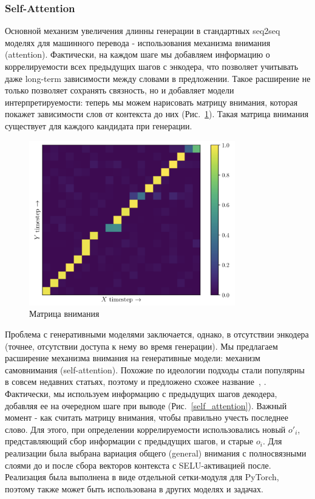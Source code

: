\documentclass{spbau-diploma}
\begin{document}
\subsubsection{Self-Attention}
Основной механизм увеличения длинны генерации в стандартных seq2seq моделях
для машинного перевода - использования механизма внимания (attention). 
Фактически, на каждом шаге мы добавляем информацию о коррелируемости всех 
предыдущих шагов с энкодера, что позволяет учитывать даже long-term 
зависимости между словами в предложении. Такое расширение не только позволяет
сохранять связность, но и добавляет модели интерпретируемости: теперь мы можем
нарисовать матрицу внимания, которая покажет зависимости слов от контекста до 
них (Рис.~\ref{attention}). Такая матрица внимания существует для каждого 
кандидата при генерации.

\begin{figure}[h]
\centering
\includegraphics[width=0.8\textwidth]{images/attention.png}
\caption{Матрица внимания}
\label{attention}
\end{figure}

Проблема с генеративными моделями заключается, однако, в отсутствии энкодера 
(точнее, отсутствии доступа к нему во время генерации). Мы предлагаем 
расширение механизма внимания на генеративные модели: механизм 
самовнимания (self-attention). Похожие по идеологии подходы стали популярны в 
совсем недавних статьях, поэтому и предложено схожее 
название~\cite{1706.03762}, \cite{1805.08318}. Фактически, мы используем 
информацию с предыдущих шагов декодера, добавляя ее на очередном шаге при 
выводе (Рис.~\ref{self_attention}). Важный момент - как считать матрицу 
внимания, чтобы правильно учесть последнее слово. Для этого, при определении 
коррелируемости использовались новый $o'_i$, представляющий сбор информации с 
предыдущих шагов, и старые $o_i$. Для реализации 
была выбрана вариация общего (general) внимания с полносвязными слоями до и 
после сбора векторов контекста с SELU-активацией после. Реализация была 
выполнена в виде отдельной сетки-модуля для PyTorch, поэтому также может быть
использована в других моделях и задачах.
\end{document}
